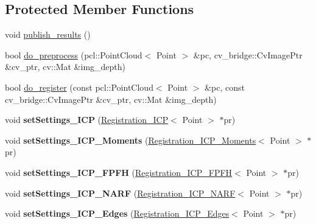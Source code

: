 \subsection*{Protected Member Functions}
\begin{DoxyCompactItemize}
\item 
void \hyperlink{classRegistrationNode_a4c014e25b84d541c26b381d7c163f9f4}{publish\_\-results} ()
\item 
bool \hyperlink{classRegistrationNode_a49613a1b302f646f7e222c0daa1a9e7b}{do\_\-preprocess} (pcl::PointCloud$<$ Point $>$ \&pc, cv\_\-bridge::CvImagePtr \&cv\_\-ptr, cv::Mat \&img\_\-depth)
\item 
bool \hyperlink{classRegistrationNode_a4c57bd480d76df5ab6b186a6521d1822}{do\_\-register} (const pcl::PointCloud$<$ Point $>$ \&pc, const cv\_\-bridge::CvImagePtr \&cv\_\-ptr, cv::Mat \&img\_\-depth)
\item 
\hypertarget{classRegistrationNode_ad37f0db5fd52b870426794d2b44cef08}{
void {\bfseries setSettings\_\-ICP} (\hyperlink{classRegistration__ICP}{Registration\_\-ICP}$<$ Point $>$ $\ast$pr)}
\label{classRegistrationNode_ad37f0db5fd52b870426794d2b44cef08}

\item 
\hypertarget{classRegistrationNode_aaf68c48a76890081dd89ffecb9d6c1c7}{
void {\bfseries setSettings\_\-ICP\_\-Moments} (\hyperlink{classRegistration__ICP__Moments}{Registration\_\-ICP\_\-Moments}$<$ Point $>$ $\ast$pr)}
\label{classRegistrationNode_aaf68c48a76890081dd89ffecb9d6c1c7}

\item 
\hypertarget{classRegistrationNode_a82d75e7f4013b917ce3e1f57b12e87e8}{
void {\bfseries setSettings\_\-ICP\_\-FPFH} (\hyperlink{classRegistration__ICP__FPFH}{Registration\_\-ICP\_\-FPFH}$<$ Point $>$ $\ast$pr)}
\label{classRegistrationNode_a82d75e7f4013b917ce3e1f57b12e87e8}

\item 
\hypertarget{classRegistrationNode_a924764ad64859741ebe4a8e1070f08a9}{
void {\bfseries setSettings\_\-ICP\_\-NARF} (\hyperlink{classRegistration__ICP__NARF}{Registration\_\-ICP\_\-NARF}$<$ Point $>$ $\ast$pr)}
\label{classRegistrationNode_a924764ad64859741ebe4a8e1070f08a9}

\item 
\hypertarget{classRegistrationNode_a4929fcef285c47872eb412b99a5a6286}{
void {\bfseries setSettings\_\-ICP\_\-Edges} (\hyperlink{classRegistration__ICP__Edges}{Registration\_\-ICP\_\-Edges}$<$ Point $>$ $\ast$pr)}
\label{classRegistrationNode_a4929fcef285c47872eb412b99a5a6286}


\end{DoxyCompactItemize}
